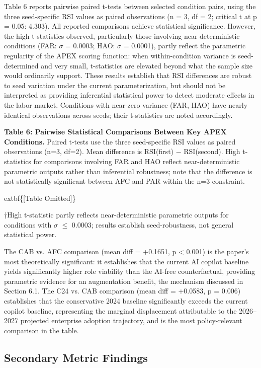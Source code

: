 \documentclass[10pt, conference]{IEEEtran}
\begin{document}
\label{sec:statistical_comparisons}

Table 6 reports pairwise paired t-tests between selected condition pairs, using the three seed-specific RSI values as paired observations (n = 3, df = 2; critical t at p = 0.05: 4.303). All reported comparisons achieve statistical significance. However, the high t-statistics observed, particularly those involving near-deterministic conditions (FAR: $\sigma$ = 0.0003; HAO: $\sigma$ = 0.0001), partly reflect the parametric regularity of the APEX scoring function: when within-condition variance is seed-determined and very small, t-statistics are elevated beyond what the sample size would ordinarily support. These results establish that RSI differences are robust to seed variation under the current parameterization, but should not be interpreted as providing inferential statistical power to detect moderate effects in the labor market. Conditions with near-zero variance (FAR, HAO) have nearly identical observations across seeds; their t-statistics are noted accordingly.

\textbf{Table 6: Pairwise Statistical Comparisons Between Key APEX Conditions.} Paired t-tests use the three seed-specific RSI values as paired observations (n=3, df=2). Mean difference is RSI(first) $-$ RSI(second). High t-statistics for comparisons involving FAR and HAO reflect near-deterministic parametric outputs rather than inferential robustness; note that the difference is not statistically significant between AFC and PAR within the n=3 constraint.

	extbf\{[Table Omitted]\}

†High t-statistic partly reflects near-deterministic parametric outputs for conditions with $\sigma$ $\leq$ 0.0003; results establish seed-robustness, not general statistical power.

The CAB vs. AFC comparison (mean diff = +0.1651, p < 0.001) is the paper's most theoretically significant: it establishes that the current AI copilot baseline yields significantly higher role viability than the AI-free counterfactual, providing parametric evidence for an augmentation benefit, the mechanism discussed in Section 6.1. The C24 vs. CAB comparison (mean diff = +0.0583, p = 0.006) establishes that the conservative 2024 baseline significantly exceeds the current copilot baseline, representing the marginal displacement attributable to the 2026--2027 projected enterprise adoption trajectory, and is the most policy-relevant comparison in the table.

\subsection{Secondary Metric Findings}
\end{document}
